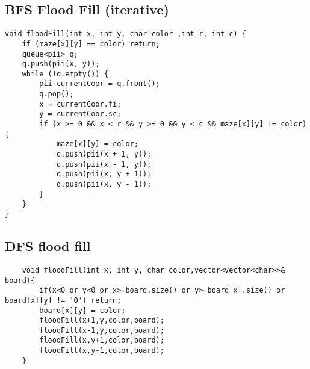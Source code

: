 \documentclass{article}
\begin{document}
\subsection{BFS Flood Fill (iterative)}
\begin{lstlisting}
void floodFill(int x, int y, char color ,int r, int c) {
	if (maze[x][y] == color) return;
	queue<pii> q;
	q.push(pii(x, y));
    while (!q.empty()) {
        pii currentCoor = q.front();
        q.pop();
        x = currentCoor.fi;
        y = currentCoor.sc;
        if (x >= 0 && x < r && y >= 0 && y < c && maze[x][y] != color) {
            maze[x][y] = color;
            q.push(pii(x + 1, y));
            q.push(pii(x - 1, y));
            q.push(pii(x, y + 1));
            q.push(pii(x, y - 1));
        }
    }
}
\end{lstlisting}
\subsection{DFS flood fill}
\begin{lstlisting}
    void floodFill(int x, int y, char color,vector<vector<char>>& board){
        if(x<0 or y<0 or x>=board.size() or y>=board[x].size() or board[x][y] != 'O') return;
        board[x][y] = color;
        floodFill(x+1,y,color,board);
        floodFill(x-1,y,color,board);
        floodFill(x,y+1,color,board);
        floodFill(x,y-1,color,board);
    }
\end{lstlisting}
\end{document}
